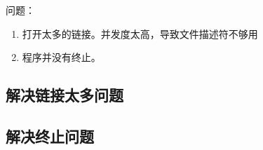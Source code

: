问题：

\begin{enumerate}
\tightlist
\item
  打开太多的链接。并发度太高，导致文件描述符不够用
\item
  程序并没有终止。
\end{enumerate}

\hypertarget{ux89e3ux51b3ux94feux63a5ux592aux591aux95eeux9898}{%
\subsection{解决链接太多问题}\label{ux89e3ux51b3ux94feux63a5ux592aux591aux95eeux9898}}

\begin{Shaded}
\begin{Highlighting}[]
\NormalTok{(} \NormalTok{\{\}, }\NormalTok{)}
\NormalTok{) []}\NormalTok{ \{}
\NormalTok{\{\}\{\} }
  \NormalTok{ \{}
\NormalTok{  \}}
\NormalTok{\}}
\end{Highlighting}
\end{Shaded}

\hypertarget{ux89e3ux51b3ux7ec8ux6b62ux95eeux9898}{%
\subsection{解决终止问题}\label{ux89e3ux51b3ux7ec8ux6b62ux95eeux9898}}

